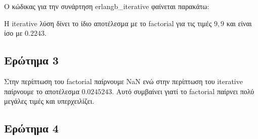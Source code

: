 \documentclass[12pt]{article}
\begin{document}
Ο κώδικας για την συνάρτηση erlangb\_iterative φαίνεται παρακάτω:



Η iterative λύση δίνει το ίδιο αποτέλεσμα με το factorial για τις τιμές $9,9$ και είναι
ίσο με $0.2243$.

\subsection{Ερώτημα 3}
Στην περίπτωση του factorial παίρνουμε NaN ενώ στην περίπτωση του iterative παίρνουμε 
το αποτέλεσμα $0.0245243$. Αυτό συμβαίνει γιατί το factorial παίρνει πολύ μεγάλες τιμές
και υπερχειλίζει.

\subsection{Ερώτημα 4}
\end{document}
